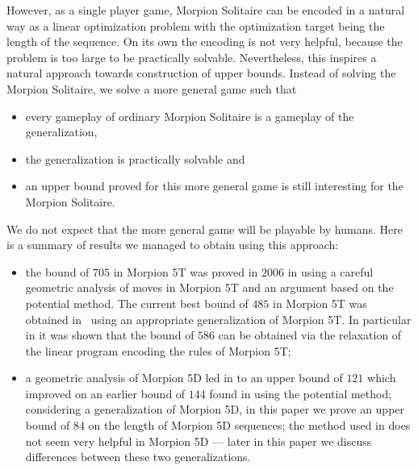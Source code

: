 However, as a single player game, Morpion Solitaire can be  encoded in a natural way as a linear optimization problem with the optimization target being the length of the sequence. On its own the encoding is not very helpful, because the problem is too large to be practically solvable. Nevertheless, this inspires a natural approach towards construction of upper bounds. Instead of solving the Morpion Solitaire, we solve
a more general game such that
\begin{itemize}
\item every gameplay of ordinary  Morpion Solitaire is a gameplay of the generalization,
\item the generalization is practically solvable and
\item an upper bound proved for this more general game is still interesting for the Morpion Solitaire. 
\end{itemize}
We do not expect that the more general game will be playable by humans. Here is a summary of results we managed to obtain using this approach:
\begin{itemize}
\item the %
bound of $705$ in Morpion 5T was proved in $2006$ in \cite{demaine} using a careful geometric analysis of moves in Morpion 5T and an argument based
on the potential method. The current best bound of $485$ in Morpion 5T was obtained in~\cite{ijcai} using an appropriate generalization of Morpion 5T. In particular in \cite{ijcai} it was shown that the bound of $586$ can be obtained via the relaxation of the linear program encoding the rules of  Morpion 5T;
\item a geometric analysis of Morpion 5D led in \cite{japonczycy} to an upper bound of $121$ which improved on an earlier bound of $144$ found in \cite{demaine} using the potential method; considering a generalization of Morpion 5D, in this paper we prove an upper bound of $84$ on the length of Morpion 5D sequences;
the method used in  \cite{ijcai} does not seem very helpful in Morpion 5D --- later in this paper we discuss differences between these two generalizations. 
\end{itemize}

